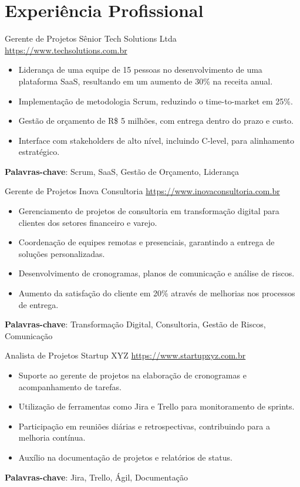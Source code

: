 \documentclass[a4paper, serif, 10pt]{moderncv}
\begin{document}
\section{Experiência Profissional}

        {Gerente de Projetos Sênior}
        {Tech Solutions Ltda}
        {\url{https://www.techsolutions.com.br}}
        {}
        {\begin{itemize}
\item Liderança de uma equipe de 15 pessoas no desenvolvimento de uma plataforma SaaS, resultando em um aumento de 30\% na receita anual.
\item Implementação de metodologia Scrum, reduzindo o time-to-market em 25\%.
\item Gestão de orçamento de R\$ 5 milhões, com entrega dentro do prazo e custo.
\item Interface com stakeholders de alto nível, incluindo C-level, para alinhamento estratégico.
\end{itemize}
\textbf{Palavras-chave}: Scrum, SaaS, Gestão de Orçamento, Liderança}

        {Gerente de Projetos}
        {Inova Consultoria}
        {\url{https://www.inovaconsultoria.com.br}}
        {}
        {\begin{itemize}
\item Gerenciamento de projetos de consultoria em transformação digital para clientes dos setores financeiro e varejo.
\item Coordenação de equipes remotas e presenciais, garantindo a entrega de soluções personalizadas.
\item Desenvolvimento de cronogramas, planos de comunicação e análise de riscos.
\item Aumento da satisfação do cliente em 20\% através de melhorias nos processos de entrega.
\end{itemize}
\textbf{Palavras-chave}: Transformação Digital, Consultoria, Gestão de Riscos, Comunicação}

        {Analista de Projetos}
        {Startup XYZ}
        {\url{https://www.startupxyz.com.br}}
        {}
        {\begin{itemize}
\item Suporte ao gerente de projetos na elaboração de cronogramas e acompanhamento de tarefas.
\item Utilização de ferramentas como Jira e Trello para monitoramento de sprints.
\item Participação em reuniões diárias e retrospectivas, contribuindo para a melhoria contínua.
\item Auxílio na documentação de projetos e relatórios de status.
\end{itemize}
\textbf{Palavras-chave}: Jira, Trello, Ágil, Documentação}
\end{document}
